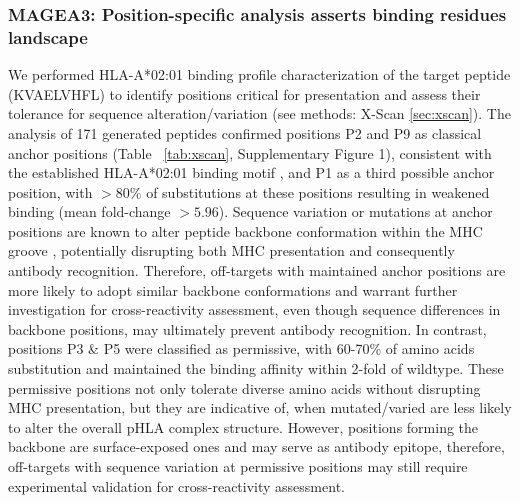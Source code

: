 \documentclass[unnumsec,webpdf,contemporary,large]{oup-authoring-template}%
\theoremstyle{thmstyleone}%
\theoremstyle{thmstyletwo}%
\theoremstyle{thmstylethree}%
\begin{document}
        \subsubsection{\textbf{MAGEA3: Position-specific analysis asserts binding residues landscape}}
        We performed HLA-A*02:01 binding profile characterization of the target peptide (KVAELVHFL) to identify positions critical for presentation and assess their tolerance for sequence alteration/variation (see methods: X-Scan \ref{sec:xscan}). The analysis of 171 generated peptides confirmed positions P2 and P9 as classical anchor positions (Table ~\ref{tab:xscan}, Supplementary Figure 1), consistent with the established HLA-A*02:01 binding motif \cite{hutchison2018identifying}, and P1 as a third possible anchor position, with $>80\%$ of substitutions at these positions resulting in weakened binding (mean fold-change $>5.96$). Sequence variation or mutations at anchor positions are known to alter peptide backbone conformation within the MHC groove \cite{theodossis2010constraints,cole2010modification}, potentially disrupting both MHC presentation and consequently antibody recognition. Therefore, off-targets with maintained anchor positions are more likely to adopt similar backbone conformations and warrant further investigation for cross-reactivity assessment, even though sequence differences in backbone positions, may ultimately prevent antibody recognition.  
        In contrast, positions P3 \& P5 were classified as permissive, with 60-70\% of amino acids substitution and maintained the binding affinity within 2-fold of wildtype. These permissive positions not only tolerate diverse amino acids without disrupting MHC presentation, but they are indicative of, when mutated/varied are less likely to alter the overall pHLA complex structure. However, positions forming the backbone are surface-exposed ones and may serve as antibody epitope, therefore, off-targets with sequence variation at permissive positions may still require experimental validation for cross-reactivity assessment.  
\end{document}

